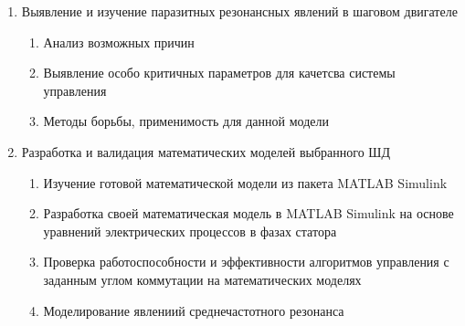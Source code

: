 \begin{enumerate}
    \item{Выявление и изучение паразитных резонансных явлений в шаговом двигателе}
        \begin{enumerate}
            \item Анализ возможных причин
            \item Выявление особо критичных параметров для качетсва системы уп\-рав\-лен\-ия
            \item Методы борьбы, применимость для данной модели
        \end{enumerate}

    \item{Разработка и валидация математических моделей выбранного ШД}
        \begin{enumerate}
            \item Изучение готовой математической модели из пакета MAT\-LAB Si\-mu\-link
            \item Разработка своей математическая модель в \foreignlanguage{english}{MAT\-LAB Si\-mu\-link} на основе
                    уравнений электрических процессов в фазах статора
            \item Проверка работоспособности и эффективности алгоритмов управления с заданным углом
                    коммутации на математических моделях
            \item Моделирование явлениий среднечастотного резонанса
        \end{enumerate}
\end{enumerate}
